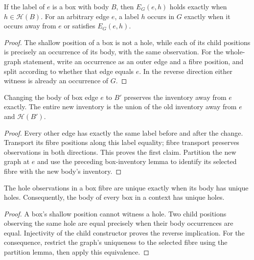 \begin{lemma}
If the label of $e$ is a box with body $B$, then $E_G(e,h)$ holds exactly when
$h\in\mathcal H(B)$. For an arbitrary edge $e$, a label $h$ occurs in $G$ exactly
when it occurs away from $e$ or satisfies $E_G(e,h)$.
\end{lemma}
\begin{proof}
The shallow position of a box is not a hole, while each of its child positions
is precisely an occurrence of its body, with the same observation. For the
whole-graph statement, write an occurrence as an outer edge and a fibre
position, and split according to whether that edge equals $e$. In the reverse
direction either witness is already an occurrence of $G$.
\end{proof}

\begin{lemma}
Changing the body of box edge $e$ to $B'$ preserves the inventory away from $e$
exactly. The entire new inventory is the union of the old inventory away from
$e$ and $\mathcal H(B')$.
\end{lemma}
\begin{proof}
Every other edge has exactly the same label before and after the change.
Transport its fibre positions along this label equality; fibre transport
preserves observations in both directions. This proves the first claim.
Partition the new graph at $e$ and use the preceding box-inventory lemma to
identify its selected fibre with the new body's inventory.
\end{proof}

\begin{lemma}
The hole observations in a box fibre are unique exactly when its body has
unique holes. Consequently, the body of every box in a context has unique holes.
\end{lemma}
\begin{proof}
A box's shallow position cannot witness a hole. Two child positions observing
the same hole are equal precisely when their body occurrences are equal.
Injectivity of the child constructor proves the reverse implication. For the
consequence, restrict the graph's uniqueness to the selected fibre using the
partition lemma, then apply this equivalence.
\end{proof}

